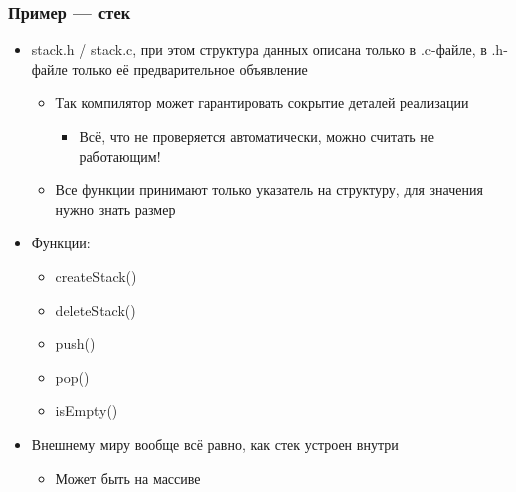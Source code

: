 \documentclass{../../slides-style}
\begin{document}
    \begin{frame}
        \frametitle{Пример --- стек}
        \begin{itemize}
            \item stack.h / stack.c, при этом структура данных описана только в .c-файле, в .h-файле только её предварительное объявление
            \begin{itemize}
                \item Так компилятор может гарантировать сокрытие деталей реализации
                \begin{itemize}
                    \item Всё, что не проверяется автоматически, можно считать не работающим!
                \end{itemize}
                \item Все функции принимают только указатель на структуру, для значения нужно знать размер
            \end{itemize}
            \item Функции:
            \begin{itemize}
                \item createStack()
                \item deleteStack()
                \item push()
                \item pop()
                \item isEmpty()
            \end{itemize}
            \item Внешнему миру вообще всё равно, как стек устроен внутри
            \begin{itemize}
                \item Может быть на массиве
            \end{itemize}
        \end{itemize}
    \end{frame}
\end{document}
